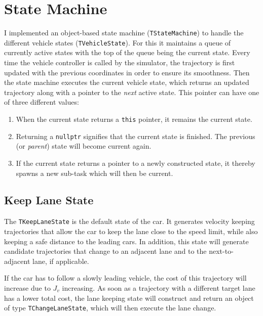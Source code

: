 \documentclass[twoside]{article}
\newcommand{\code}[1]{{\texttt{#1}}}
\begin{document}
\section{State Machine}
I implemented an object-based state machine (\code{TStateMachine}) to handle the different
vehicle states (\code{TVehicleState}). For this it maintains a queue of currently active states
with the top of the queue being the current state. Every time the vehicle controller is called
by the simulator, the trajectory is first updated with the previous coordinates in order to
ensure its smoothness. Then the state machine executes the current vehicle state, which returns
an updated trajectory along with a pointer to the \emph{next} active state. This pointer can
have one of three different values:
\begin{enumerate}
\item When the current state returns a \code{this} pointer, it remains the current state.
\item Returning a \code{nullptr} signifies that the current state is finished. The previous
(or \emph{parent}) state will become current again.
\item If the current state returns a pointer to a newly constructed state, it thereby spawns a new
sub-task which will then be current.
\end{enumerate}


\subsection{Keep Lane State}
The \code{TKeepLaneState} is the default state of the car. It generates velocity keeping
trajectories that allow the car to keep the lane close to the speed limit, while also keeping
a safe distance to the leading cars. In addition, this state will generate candidate
trajectories that change to an adjacent lane and to the next-to-adjacent lane, if applicable.

If the car has to follow a slowly leading vehicle, the cost of this trajectory will
increase due to $J_{v}$ increasing. As soon as a trajectory with a different target lane
has a lower total cost, the lane keeping state will construct and return an object of type \code{TChangeLaneState}, which will then execute the lane change.
\end{document}

